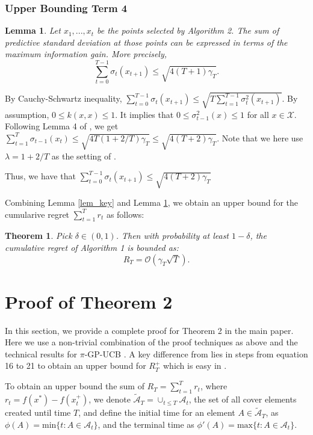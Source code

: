 \documentclass[twoside]{article}
\newtheorem{theorem}{Theorem}
\newtheorem{lemma}{Lemma}
\newenvironment{proof*}[1][\proofname]{
  \renewcommand\qedsymbol{\rule{2.5mm}{2.5mm}}
  \begin{proof}[#1]}{\end{proof}}
\begin{document}
\subsubsection{Upper Bounding Term 4}
\begin{lemma}
Let $x_1, ..., x_t$ be the points selected by Algorithm 2. The sum of predictive standard deviation at those points can be expressed in terms of the maximum information gain. More precisely,
$$\sum_{t=0}^{T-1} \sigma_{t}(x_{t+1}) \le  \sqrt{4(T+1)\gamma_T}.$$
\label{lem_gain}
\end{lemma}
\begin{proof*}
By Cauchy-Schwartz inequality, $\sum_{t=0}^{T-1} \sigma_{t}(x_{t+1}) \le \sqrt{T\sum_{t=1}^{T-1} \sigma^2_{t}(x_{t+1})}$. By assumption, $0\le k(x,x) \le 1$. It implies that $0 \le \sigma_{t-1}^2(x) \le 1$ for all $x \in \mathcal X$. Following Lemma 4 of \citep{Chowdhury17}, we get
$\sum_{t=1}^{T} \sigma_{t-1}(x_t) \le \sqrt{4T(1 + 2/T)\gamma_T} \le \sqrt{4(T+2)\gamma_T}$. Note that we here use $\lambda = 1 + 2/T$ as the setting of \citep{Chowdhury17}.

Thus, we have that $\sum_{t=0}^{T-1} \sigma_{t}(x_{t+1})  \le \sqrt{4(T + 2)\gamma_T}$
\end{proof*}
Combining Lemma \ref{lem_key} and Lemma \ref{lem_gain}, we obtain an upper bound for the cumularive regret $\sum_{t=1}^{T}r_t$ as follows:
\begin{theorem}
Pick $\delta \in (0,1)$. Then with probability at least $1 - \delta$, the cumulative regret of Algorithm 1 is bounded as:
$$R_T = \mathcal O(\gamma_T\sqrt{T}).$$
\end{theorem}
\section{Proof of Theorem 2}
In this section, we provide a complete proof for Theorem 2 in the main paper. Here we use a non-trivial combination of the proof techniques as above and the technical results for $\pi$-GP-UCB \citep{janz20a}. A key difference from \citep{janz20a} lies in steps from equation 16 to 21 to obtain an upper bound for $R_T^+$ which is easy in \citep{janz20a}.

To obtain an upper bound the sum of $R_T = \sum_{t=1}^{T} r_t$, where $r_t = f(x^*) - f(x^+_t)$,  we denote $\tilde{\mathcal A}_T = \cup_{t \le T} \mathcal A_t$, the set of all cover elements created until time $T$, and define the initial time for an element $A \in \tilde{\mathcal A}_T $, as $\phi(A) = \text{min}\{t: A \in \mathcal A_t\}$, and the terminal time as $\phi'(A) = \text{max}\{t: A \in \mathcal A_t\}$.
\end{document}
